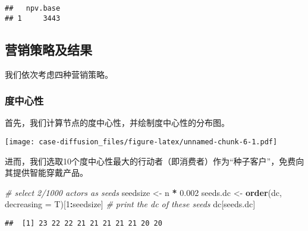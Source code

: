 \documentclass[]{article}
\newenvironment{Shaded}{\begin{snugshade}}{\end{snugshade}}
\newcommand{\CommentTok}[1]{\textcolor[rgb]{0.56,0.35,0.01}{\textit{#1}}}
\newcommand{\DataTypeTok}[1]{\textcolor[rgb]{0.13,0.29,0.53}{#1}}
\newcommand{\DecValTok}[1]{\textcolor[rgb]{0.00,0.00,0.81}{#1}}
\newcommand{\FloatTok}[1]{\textcolor[rgb]{0.00,0.00,0.81}{#1}}
\newcommand{\KeywordTok}[1]{\textcolor[rgb]{0.13,0.29,0.53}{\textbf{#1}}}
\newcommand{\NormalTok}[1]{#1}
\newcommand{\OperatorTok}[1]{\textcolor[rgb]{0.81,0.36,0.00}{\textbf{#1}}}
\newcommand{\StringTok}[1]{\textcolor[rgb]{0.31,0.60,0.02}{#1}}
\begin{document}
\begin{verbatim}
##   npv.base
## 1     3443
\end{verbatim}

\subsection{营销策略及结果}

我们依次考虑四种营销策略。

\subsubsection{度中心性}

首先，我们计算节点的度中心性，并绘制度中心性的分布图。

\begin{Shaded}
\end{Shaded}

\texttt{[image: case-diffusion\_files/figure-latex/unnamed-chunk-6-1.pdf]}

进而，我们选取10个度中心性最大的行动者（即消费者）作为``种子客户''，免费向其提供智能穿戴产品。

\begin{Shaded}
\begin{Highlighting}[]
\CommentTok{# select 2/1000 actors as seeds}
\NormalTok{seedsize <-}\StringTok{ }\NormalTok{n }\OperatorTok{*}\StringTok{ }\FloatTok{0.002}
\NormalTok{seeds.dc <-}\StringTok{ }\KeywordTok{order}\NormalTok{(dc, }\DataTypeTok{decreasing =}\NormalTok{ T)[}\DecValTok{1}\OperatorTok{:}\NormalTok{seedsize]}
\CommentTok{# print the dc of these seeds}
\NormalTok{dc[seeds.dc]}
\end{Highlighting}
\end{Shaded}

\begin{verbatim}
##  [1] 23 22 22 21 21 21 21 21 20 20
\end{verbatim}
\end{document}
